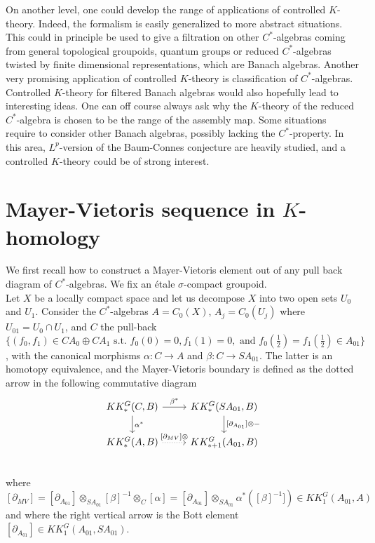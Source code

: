 On another level, one could develop the range of applications of controlled $K$-theory. Indeed, the formalism is easily generalized to more abstract situations. This could in principle be used to give a filtration on other $C^*$-algebras coming from general topological groupoids, quantum groups or reduced $C^*$-algebras twisted by finite dimensional representations, which are Banach algebras. Another very promising application of controlled $K$-theory is classification of $C^*$-algebras. \\

Controlled $K$-theory for filtered Banach algebras would also hopefully lead to interesting ideas. One can off course always ask why the $K$-theory of the reduced $C^*$-algebra is chosen to be the range of the assembly map. Some situations require to consider other Banach algebras, possibly lacking the $C^*$-property. In this area, $L^p$-version of the Baum-Connes conjecture are heavily studied, and a controlled $K$-theory could be of strong interest.\\

\section{Mayer-Vietoris sequence in $K$-homology}

We first recall how to construct a Mayer-Vietoris element out of any pull back diagram of $C^*$-algebras. We fix an étale $\sigma$-compact groupoid.\\

Let $X$ be a locally compact space and let us decompose $X$ into two open sets $U_0$ and $U_1$. Consider the $C^*$-algebras $A=C_0(X)$, $A_j=C_0(U_j)$ where $U_{01}=U_0\cap U_1$, and $C$ the pull-back $\{(f_0,f_1) \in CA_0\oplus CA_1 \text{ s.t. } f_0(0)=0,f_1(1)=0,\text{ and } f_0(\frac{1}{2})=f_1(\frac{1}{2})\in A_{01}\}$, with the canonical morphisms $\alpha :C \rightarrow A$ and $\beta : C \rightarrow SA_{01}$. The latter is an homotopy equivalence, and the Mayer-Vietoris boundary is defined as the dotted arrow in the following commutative diagram
\[\begin{tikzcd}
KK^G_*(C,B) \arrow{r}{\beta^*}\arrow{d}{ \alpha^*}& KK^G_*(SA_{01},B)\arrow{d}{[\partial_{A_{01}}]\otimes -}\\
KK^G_*(A,B) \arrow[dotted]{r}{ [\partial_{MV}] \otimes}& KK^G_{*+1}(A_{01},B)\\
\end{tikzcd}\]
where $[\partial_{MV}]=[\partial_{A_{01}}]\otimes_{SA_{01}} [\beta]^{-1}\otimes_C [\alpha] = [\partial_{A_{01}}]\otimes_{SA_{01}} \alpha^*([\beta]^{-1}])\in KK^G_1(A_{01},A)$ and where the right vertical arrow is the Bott element $[\partial_{A_{01}}]\in KK_1^G(A_{01},SA_{01})$.\\

